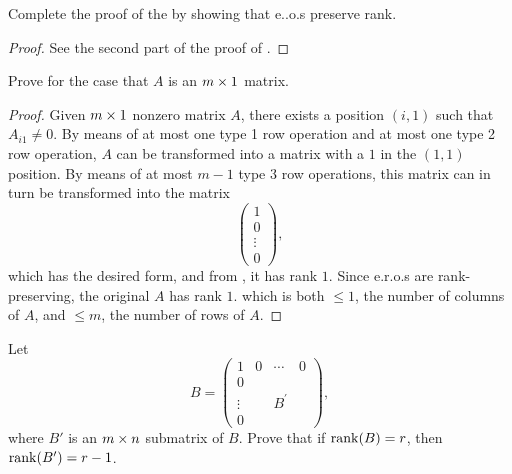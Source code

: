 \begin{exercise} \label{exercise 3.2.9}
Complete the proof of the  by showing that e..o.s preserve rank.
\end{exercise}

\begin{proof}
See the second part of the proof of .
\end{proof}

\begin{exercise} \label{exercise 3.2.10}
Prove  for the case that \(A\) is an \(m \times 1\) matrix.
\end{exercise}

\begin{proof}
Given \(m \times 1\) nonzero matrix \(A\), there exists a position \((i, 1)\) such that \(A_{i1} \ne 0\).
By means of at most one type 1 row operation and at most one type 2 row operation, \(A\) can be transformed into a matrix with a \(1\) in the \((1, 1)\) position.
By means of at most \(m - 1\) type 3 row operations, this matrix can in turn be transformed into the matrix
\[
\begin{pmatrix} 1 \\ 0 \\ \vdots \\ 0 \end{pmatrix},
\]
which has the desired form, and from , it has rank \(1\).
Since e.r.o.s are rank-preserving, the original \(A\) has rank \(1\). which is both \(\le 1\), the number of columns of \(A\), and \(\le m\), the number of rows of \(A\).
\end{proof}

\begin{exercise} \label{exercise 3.2.11}
Let
\[
    B = \left(\begin{array}{c|ccc}
        1 & 0 & \cdots & 0 \\
        \hline 0 & & & \\
        \vdots & & B^{\prime} & \\
        0 & & &
    \end{array}\right),
\]
where \(B'\) is an \(m \times n\) submatrix of \(B\).
Prove that if \(\mathrm{rank}(B) = r\), then \(\mathrm{rank}(B') = r - 1\).
\end{exercise}

